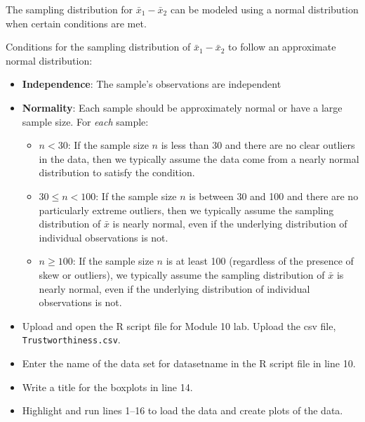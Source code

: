 \documentclass[
]{report}
\begin{document}
\vspace{0.8in}

The sampling distribution for \(\bar{x}_1-\bar{x}_2\) can be modeled using a normal distribution when certain conditions are met.

Conditions for the sampling distribution of \(\bar{x}_1-\bar{x}_2\) to follow an approximate normal distribution:

\begin{itemize}
\item
  \textbf{Independence}: The sample's observations are independent
\item
  \textbf{Normality}: Each sample should be approximately normal or have a large sample size. For \emph{each} sample:

  \begin{itemize}
  \item
    \(n < 30\): If the sample size \(n\) is less than 30 and there are no clear outliers in the data, then we typically assume the data come from a nearly normal distribution to satisfy the condition.
  \item
    \(30 \le n < 100\): If the sample size \(n\) is between 30 and 100 and there are no particularly extreme outliers, then we typically assume the sampling distribution of \(\bar{x}\) is nearly normal, even if the underlying distribution of individual observations is not.
  \item
    \(n \geq 100\): If the sample size \(n\) is at least 100 (regardless of the presence of skew or outliers), we typically assume the sampling distribution of \(\bar{x}\) is nearly normal, even if the underlying distribution of individual observations is not.
  \end{itemize}
\item
  Upload and open the R script file for Module 10 lab. Upload the csv file, \texttt{Trustworthiness.csv}.
\item
  Enter the name of the data set for datasetname in the R script file in line 10.
\item
  Write a title for the boxplots in line 14.
\item
  Highlight and run lines 1--16 to load the data and create plots of the data.
\end{itemize}
\end{document}
